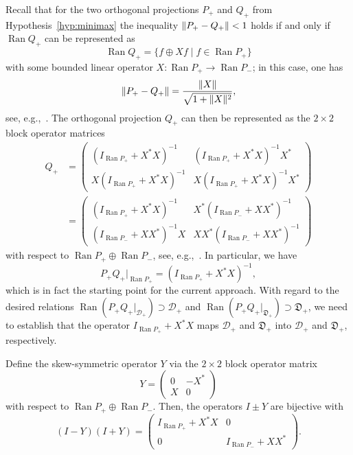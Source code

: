 \documentclass[11pt,a4paper]{amsart}
\numberwithin{equation}{section}
\DeclareMathOperator{\Ran}{Ran}
\DeclarePairedDelimiter{\norm}{\lVert}{\rVert}
\newcommand{\cD}{{\mathcal D}}
\newcommand{\fD}{{\mathfrak D}}
\theoremstyle{plain}
\theoremstyle{definition}
\theoremstyle{remark}
\begin{document}
Recall that for the two orthogonal projections $P_+$ and $Q_+$ from Hypothesis~\ref{hyp:minimax} the inequality
$\norm{P_+-Q_+}<1$ holds if and only if $\Ran Q_+$ can be represented as
\begin{equation}\label{eq:graph}
  \Ran Q_+ = \{ f \oplus Xf \mid f\in\Ran P_+ \}
\end{equation}
with some bounded linear operator $X\colon\Ran P_+\to\Ran P_-$; in this case, one has
\begin{equation}\label{eq:normPQX}
  \norm{P_+-Q_+}
  =
  \frac{\norm{X}}{\sqrt{1+\norm{X}^2}}
  ,
\end{equation}
see, e.g.,~\cite[Corollary~3.4\,(i)]{KMM03:181}. The orthogonal projection $Q_+$ can then be represented as the $2\times2$ block
operator matrices
\begin{equation}\label{eq:reprQ}
 \begin{aligned}
  Q_+
  &=
  \begin{pmatrix}
    (I_{\Ran P_+}+X^*X)^{-1} & (I_{\Ran P_+}+X^*X)^{-1}X^*\\
    X(I_{\Ran P_+}+X^*X)^{-1} & X(I_{\Ran P_+}+X^*X)^{-1}X^*
  \end{pmatrix}\\
  &=
  \begin{pmatrix}
    (I_{\Ran P_+}+X^*X)^{-1} & X^*(I_{\Ran P_-}+XX^*)^{-1}\\
    (I_{\Ran P_-}+XX^*)^{-1}X & XX^*(I_{\Ran P_-}+XX^*)^{-1}
  \end{pmatrix}
 \end{aligned}
\end{equation}
with respect to $\Ran P_+\oplus\Ran P_-$, see, e.g.,~\cite[Remark~3.6]{KMM03:181}. In particular, we have
\begin{equation}\label{eq:PQY}
  P_+Q_+|_{\Ran P_+}
  =
  (I_{\Ran P_+} + X^*X)^{-1}
  ,
\end{equation}
which is in fact the starting point for the current approach. With regard to the desired relations
$\Ran (P_+Q_+|_{\cD_+}) \supset \cD_+$ and $\Ran (P_+Q_+|_{\fD_+}) \supset \fD_+$, we need to establish that the operator
$I_{\Ran P_+} + X^*X$ maps $\cD_+$ and $\fD_+$ into $\cD_+$ and $\fD_+$, respectively.

Define the skew-symmetric operator $Y$ via the $2\times2$ block operator matrix
\begin{equation}\label{eq:defY}
  Y
  =
  \begin{pmatrix} 0 & -X^*\\ X & 0 \end{pmatrix}
\end{equation}
with respect to $\Ran P_+\oplus\Ran P_-$. Then, the operators $I\pm Y$ are bijective with
\begin{equation}\label{eq:Ypm}
  (I-Y)(I+Y)
  =
  \begin{pmatrix}
    I_{\Ran P_+}+X^*X & 0\\
    0 & I_{\Ran P_-}+XX^*
  \end{pmatrix}
  .
\end{equation}
\end{document}
